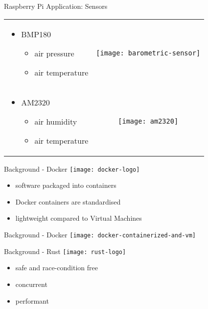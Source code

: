 \documentclass[aspectratio=1610]{beamer}
\begin{document}
  \begin{frame}{Raspberry Pi Application: Sensors}
    \begin{tabularx}{\textwidth}{XC}
      \begin{itemize}
        \item BMP180
          \begin{itemize}
            \item air pressure
            \item air temperature
          \end{itemize}
      \end{itemize}
      &
      \texttt{[image: barometric-sensor]}
      \\
      \begin{itemize}
        \item AM2320
          \begin{itemize}
            \item air humidity
            \item air temperature
          \end{itemize}
      \end{itemize}
      &
      \texttt{[image: am2320]}
    \end{tabularx}
  \end{frame}

  \begin{frame}{Background - Docker}
    \texttt{[image: docker-logo]}

    \vspace*{1.5em}

    \begin{itemize}
      \item software packaged into containers
      \item Docker containers are standardised
      \item lightweight compared to Virtual Machines
    \end{itemize}
  \end{frame}

  \begin{frame}{Background - Docker}
    \vfill
    \texttt{[image: docker-containerized-and-vm]}
  \end{frame}

  \begin{frame}{Background - Rust}
    \texttt{[image: rust-logo]}

    \vspace*{1.5em}

    \begin{itemize}
      \item safe and race-condition free
      \item concurrent
      \item performant
    \end{itemize}
  \end{frame}
\end{document}
